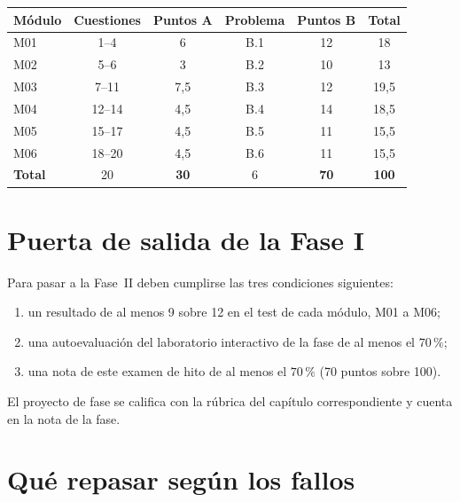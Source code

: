 \begin{center}
\begin{tabular}{@{}lccccc@{}}
\toprule
Módulo & Cuestiones & Puntos A & Problema & Puntos B & Total \\
\midrule
M01 & 1--4 & 6 & B.1 & 12 & 18 \\
M02 & 5--6 & 3 & B.2 & 10 & 13 \\
M03 & 7--11 & 7,5 & B.3 & 12 & 19,5 \\
M04 & 12--14 & 4,5 & B.4 & 14 & 18,5 \\
M05 & 15--17 & 4,5 & B.5 & 11 & 15,5 \\
M06 & 18--20 & 4,5 & B.6 & 11 & 15,5 \\
\midrule
\textbf{Total} & 20 & \textbf{30} & 6 & \textbf{70} & \textbf{100} \\
\bottomrule
\end{tabular}
\end{center}

\section{Puerta de salida de la Fase I}

Para pasar a la Fase~II deben cumplirse las tres condiciones siguientes:
\begin{enumerate}[label=\arabic*.]
  \item un resultado de al menos 9 sobre 12 en el test de cada módulo, M01 a M06;
  \item una autoevaluación del laboratorio interactivo de la fase de al menos el $70\,\%$;
  \item una nota de este examen de hito de al menos el $70\,\%$ (70 puntos sobre 100).
\end{enumerate}
El proyecto de fase se califica con la rúbrica del capítulo correspondiente y cuenta en la nota de la fase.

\section{Qué repasar según los fallos}

